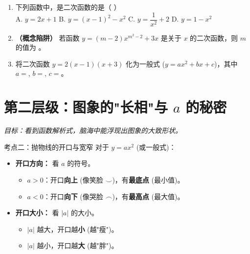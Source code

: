 \documentclass[12pt, a4paper]{article}
\begin{document}
\begin{examplebox}
    \begin{enumerate}[label=\textbf{例\arabic*.}]
        \item 下列函数中，是二次函数的是（ \quad ）\\
        A. $y = 2x + 1$ \quad B. $y = (x-1)^2 - x^2$ \quad C. $y = \dfrac{1}{x^2} + 2$ \quad D. $y = 1 - x^2$
        
        \item \textbf{（概念陷阱）} 若函数 $y = (m-2)x^{m^2-2} + 3x$ 是关于 $x$ 的二次函数，则 $m$ 的值为 \underline{\hspace{3cm}}。
        
        \item 将二次函数 $y = 2(x-1)(x+3)$ 化为一般式 ($y=ax^2+bx+c$)，其中 $a=$\underline{\hspace{1.5cm}}, $b=$\underline{\hspace{1.5cm}}, $c=$\underline{\hspace{1.5cm}}。
    \end{enumerate}
\end{examplebox}

\begin{answerblank}[第1-3题]
    \vspace{4cm}
\end{answerblank}

\newpage

\section{第二层级：图象的"长相"与 $a$ 的秘密}
\textit{目标：看到函数解析式，脑海中能浮现出图象的大致形状。}

\begin{conceptbox}{考点二：抛物线的开口与宽窄}
    对于 $y = ax^2$ (或一般式)：
    \begin{itemize}
        \item \textbf{开口方向：} 看 $a$ 的符号。
        \begin{itemize}
            \item $a > 0$：开口\textbf{向上} (像笑脸 $\smile$)，有\textbf{最底点} (最小值)。
            \item $a < 0$：开口\textbf{向下} (像哭脸 $\frown$)，有\textbf{最高点} (最大值)。
        \end{itemize}
        \item \textbf{开口大小：} 看 $|a|$ 的大小。
        \begin{itemize}
            \item $|a|$ 越大，开口越\textbf{小} (越"瘦")。
            \item $|a|$ 越小，开口越\textbf{大} (越"胖")。
        \end{itemize}
    \end{itemize}
\end{conceptbox}
\end{document}
